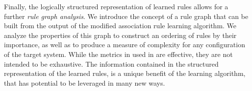 Finally, the logically structured representation of learned rules allows for a further \textit{rule graph analysis}.
We introduce the concept of a rule graph that can be built from the output of the modified association rule learning algorithm.
We analyze the properties of this graph to construct an ordering of rules by their importance, 
  as well as to produce a measure of complexity for any configuration of the target system.
While the metrics in used in \app are effective, they are not intended to be exhaustive.
The information contained in the structured representation of the learned rules, 
  is a unique benefit of the learning algorithm, that has potential to be leveraged in many new ways.

